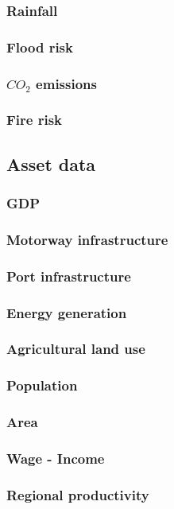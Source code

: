 \documentclass[10pt,a4]{article}
\begin{document}
\subsubsection{Rainfall}
\subsubsection{Flood risk}
\subsubsection{$CO_2$ emissions}
\subsubsection{Fire risk}

\subsection{Asset data}
\subsubsection{GDP}
\subsubsection{Motorway infrastructure}
\subsubsection{Port infrastructure}
\subsubsection{Energy generation}
\subsubsection{Agricultural land use}
\subsubsection{Population}
\subsubsection{Area}
\subsubsection{Wage - Income}
\subsubsection{Regional productivity}
\end{document}
